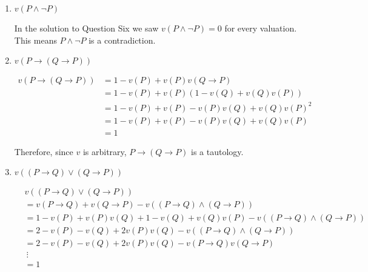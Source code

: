 \documentclass[11pt]{report}
\begin{document}
\begin{enumerate}
\begin{enumerate}
			\item $v(P \land \lnot P)$
			
			\hspace{0.2cm}{\bf Solution}

			In the solution to Question Six we saw $v(P \land \lnot P)= 0$ for every valuation. This means $P \land \lnot P$ is a contradiction. 

			\item $v(P \to (Q \to P))$
			
			\hspace{0.2cm}{\bf Solution}
						
			\begin{equation*}
				\begin{split}
					v(P \to (Q \to P)) &= 1 - v(P) + v(P)v(Q \to P)\\
					&= 1 - v(P) + v(P)(1 - v(Q) + v(Q)v(P))\\
					&= 1 - v(P) + v(P) - v(P)v(Q) + v(Q)v(P)^{2}\\
					&= 1 - v(P) + v(P) - v(P)v(Q) + v(Q)v(P)\\
					&= 1
				\end{split}
			\end{equation*}

			Therefore, since $v$ is arbitrary, $P \to (Q \to P)$ is a tautology.
			
			\newpage
			\item $v((P \to Q) \lor (Q \to P))$
			
			\hspace{0.2cm}{\bf Solution}

			\begin{equation*}
				\begin{split}
					&v((P \to Q) \lor (Q \to P))\\
					&= v(P \to Q) + v(Q \to P) - v((P \to Q)\land (Q \to P))\\
					&= 1 - v(P) + v(P)v(Q) + 1 - v(Q) + v(Q)v(P) - v((P \to Q)\land (Q \to P))\\
					&= 2 - v(P) - v(Q) + 2v(P)v(Q) - v((P \to Q)\land (Q \to P))\\
					&= 2 - v(P) - v(Q) + 2v(P)v(Q) - v(P \to Q)v(Q \to P)\\
					& \ \vdots\\
					&= 1
				\end{split}
			\end{equation*}

		\end{enumerate}
	

\end{enumerate}
\end{document}

